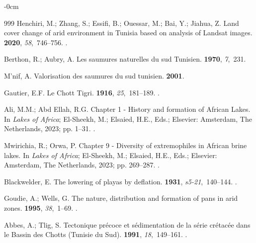 \documentclass[land,article,accept,pdftex,moreauthors]{Definitions/mdpi}
\begin{document}
\begin{adjustwidth}{-\extralength}{0cm}
\begin{thebibliography}{999}
Henchiri, M.; Zhang, S.; Essifi, B.; Ouessar, M.; Bai, Y.; Jiahua, Z.
\newblock Land cover change of arid environment in Tunisia based on analysis of
  Landsat images.
 {\bf 2020}, {\em 58},~746--756.
.

Berthon, R.; Aubry, A.
\newblock Les saumures naturelles du sud Tunisien.
 {\bf 1970}, {\em 7},~231.

M’nif, A.
\newblock Valorisation des saumures du sud tunisien.
 {\bf 2001}.

Gautier, E.F.
\newblock Le Chott Tigri.
 {\bf 1916}, {\em 25},~181--189.
.

Ali, M.M.; {Abd Ellah}, R.G.
\newblock Chapter 1 - History and formation of African Lakes. In {\em Lakes of
  Africa}; El-Sheekh, M.; Elsaied, H.E., Eds.; Elsevier: Amsterdam, The Netherlands, %
 2023; pp. 1--31.
.

Mwirichia, R.; Orwa, P.
\newblock Chapter 9 - Diversity of extremophiles in African brine lakes. In
  {\em Lakes of Africa}; El-Sheekh, M.; Elsaied, H.E., Eds.; Elsevier: Amsterdam, The Netherlands, %
  2023;
  pp. 269--287.
.

Blackwelder, E.
\newblock The lowering of playas by deflation.
 {\bf 1931}, {\em s5-21},~140--144.
.

Goudie, A.; Wells, G.
\newblock The nature, distribution and formation of pans in arid zones.
 {\bf 1995}, {\em 38},~1--69.
.

Abbes, A.; Tlig, S.
\newblock Tectonique pr\'{e}coce et s\'{e}dimentation de la s\'{e}rie
  cr\'{e}tac\'{e}e dans le Bassin des Chotts (Tunisie du Sud).
 {\bf 1991}, {\em
  18},~149--161.
.


\end{thebibliography}
\end{adjustwidth}
\end{document}
